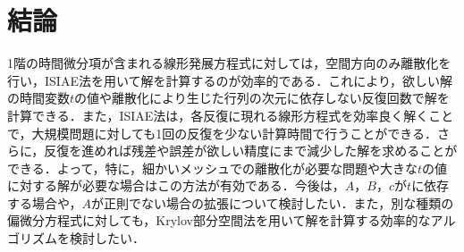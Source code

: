 \documentclass[a4paper,12pt]{nodlabpabw}
\begin{document}
\chapter{結論}
1階の時間微分項が含まれる線形発展方程式に対しては，空間方向のみ離散化を行い，ISIAE法を用いて解を計算するのが効率的である．これにより，欲しい解の時間変数$t$の値や離散化により生じた行列の次元に依存しない反復回数で解を計算できる．また，ISIAE法は，各反復に現れる線形方程式を効率良く解くことで，大規模問題に対しても1回の反復を少ない計算時間で行うことができる．さらに，反復を進めれば残差や誤差が欲しい精度にまで減少した解を求めることができる．よって，特に，細かいメッシュでの離散化が必要な問題や大きな$t$の値に対する解が必要な場合はこの方法が有効である．今後は，$A$，$B$，$c$が$t$に依存する場合や，$A$が正則でない場合の拡張について検討したい．また，別な種類の偏微分方程式に対しても，Krylov部分空間法を用いて解を計算する効率的なアルゴリズムを検討したい．
%
\end{document}
